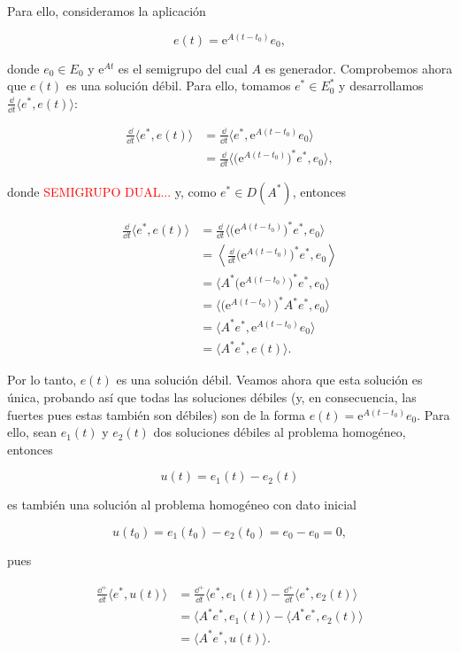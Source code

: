 Para ello, consideramos la aplicación

\[e(t) = \mathrm{e}^{A(t-t_0)}e_0,\]

donde $e_0 \in E_0$ y $\mathrm{e}^{At}$ es el semigrupo del cual $A$ es generador. Comprobemos ahora que $e(t)$ es una solución débil. Para ello, tomamos $e^* \in E_0^*$ y desarrollamos $\displaystyle\frac{\dd}{\dd t}\langle e^*, e(t)\rangle$:

\begin{align*}
    \frac{\dd}{\dd t}\langle e^*, e(t)\rangle &= \frac{\dd}{\dd t}\langle e^*, \mathrm{e}^{A(t-t_0)}e_0\rangle\\
    &= \frac{\dd}{\dd t}\Big\langle \big(\mathrm{e}^{A(t-t_0)}\big)^*e^*, e_0\Big\rangle,
\end{align*}

donde \textcolor{red}{SEMIGRUPO DUAL...} y, como $e^* \in D(A^*)$, entonces

\begin{align*}
    \frac{\dd}{\dd t}\langle e^*, e(t)\rangle &= \frac{\dd}{\dd t}\Big\langle \big(\mathrm{e}^{A(t-t_0)}\big)^*e^*, e_0\Big\rangle\\
    &= \left \langle\frac{\dd}{\dd t}\big(\mathrm{e}^{A(t-t_0)}\big)^*e^*, e_0 \right\rangle\\
    &= \Big\langle A^*\big(\mathrm{e}^{A(t-t_0)}\big)^*e^*, e_0\Big\rangle\\
    &= \Big\langle \big(\mathrm{e}^{A(t-t_0)}\big)^*A^*e^*, e_0\Big\rangle\\
    &=\langle A^*e^*, \mathrm{e}^{A(t-t_0)}e_0\rangle\\
    &=\langle A^*e^*, e(t) \rangle.
\end{align*}

Por lo tanto, $e(t)$ es una solución débil. Veamos ahora que esta solución es única, probando así que todas las soluciones débiles (y, en consecuencia, las fuertes pues estas también son débiles) son de la forma $e(t) = \mathrm{e}^{A(t-t_0)}e_0$. Para ello, sean $e_1(t)$ y $e_2(t)$ dos soluciones débiles al problema homogéneo, entonces

\[u(t) = e_1(t) - e_2(t)\]

es también una solución al problema homogéneo con dato inicial

\[u(t_0) = e_1(t_0) - e_2(t_0) = e_0 - e_0 = 0,\]

pues

\begin{align*}
    \frac{\dd^+}{\dd t}\langle e^*, u(t) \rangle &= \frac{\dd^+}{\dd t}\langle e^*, e_1(t)\rangle - \frac{\dd^+}{\dd t}\langle e^*, e_2(t)\rangle\\
    &= \langle A^*e^*, e_1(t)\rangle - \langle A^*e^*, e_2(t)\rangle\\
    &= \langle A^*e^*, u(t) \rangle.
\end{align*}

